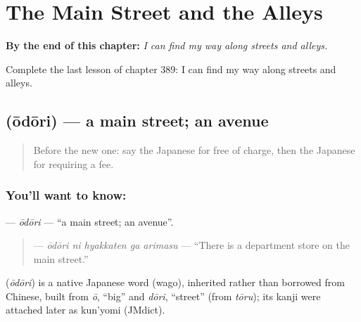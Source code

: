 
\chapter{The Main Street and the Alleys}
\label{ch:ja-the-main-street-and-the-alleys}

\begin{chapteropening}
\textbf{By the end of this chapter:} \emph{I can find my way along streets and alleys.}

Complete the last lesson of chapter 389: I can find my way along streets and alleys.
\end{chapteropening}

\section[\texorpdfstring{\ja{おおどおり} (ōdōri)}{おおどおり (ōdōri)}]{ (ōdōri) — a main street; an avenue}

\label{lesson:JA-C389-oudouri}



\begin{quote}
Before the new one: say the Japanese for free of charge, then the Japanese for requiring a fee.
\end{quote}

\subsection*{You'll want to know: }
\textbf{} — \emph{ōdōri} — \textquotedblleft{}a main street; an avenue\textquotedblright{}.

\begin{quote}
\textbf{  } — \emph{ōdōri ni hyakkaten ga arimasu} — \textquotedblleft{}There is a department store on the main street.\textquotedblright{}
\end{quote}

\begin{cousinweb}
\textbf{} (\emph{ōdōri}) is a native Japanese word (wago), inherited rather than borrowed from Chinese, built from \emph{ō}, \textquotedblleft{}big\textquotedblright{} and \emph{dōri}, \textquotedblleft{}street\textquotedblright{} (from \emph{tōru}); its kanji were attached later as kun'yomi (JMdict).
\end{cousinweb}

